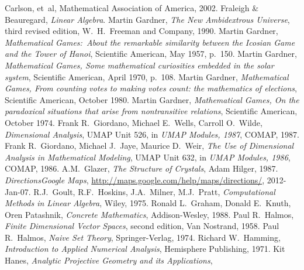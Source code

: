 \begin{thebibliography}{\makebox[2em][c]{{}\hfil{}}}
  Carlson, et~al,
  Mathematical Association of America,  
  2002.
  Fraleigh \& Beauregard,
  \emph{Linear Algebra}.
  Martin Gardner,
  \emph{The New Ambidextrous Universe},
  third revised edition,
  W.\ H.\ Freeman and Company,
  1990.
 Martin Gardner,
 \emph{Mathematical Games:~About the remarkable similarity between
   the Icosian Game and the Tower of Hanoi},
 Scientific American,
 May 1957,
 p.~150. 
  Martin Gardner,
  \emph{Mathematical Games, Some mathematical curiosities embedded in the
        solar system},
  Scientific American,
  April 1970,
  p.~108.
  Martin Gardner,
  \emph{Mathematical Games, From counting votes to making votes count:
        the mathematics of elections},
  Scientific American,
  October 1980.
  Martin Gardner,
  \emph{Mathematical Games, On the paradoxical situations that arise from
        nontransitive relations},
  Scientific American,
  October 1974.
  Frank R.~Giordano,  Michael E.~Wells, Carroll O.~Wilde,
  \emph{Dimensional Analysis}, 
  UMAP Unit 526,
  in
  \emph{UMAP Modules, 1987},
  COMAP,
  1987.
  Frank R.~Giordano,  Michael J.~Jaye, Maurice D.~Weir,
  \emph{The Use of Dimensional Analysis in Mathematical Modeling}, 
  UMAP Unit 632,
  in
  \emph{UMAP Modules, 1986},
  COMAP,
  1986.
  A.M.~Glazer,
  \emph{The Structure of Crystals},
  Adam Hilger,
  1987.
  \emph{Directions\Dash Google Maps},
  \url{http://maps.google.com/help/maps/directions/},
  2012-Jan-07.
  R.J.~Goult, R.F.~Hoskins, J.A.~Milner, M.J.~Pratt,
  \emph{Computational Methods in Linear Algebra},
  Wiley,
  1975.
 Ronald L.~Graham, Donald E.~Knuth, Oren Patashnik,
 \emph{Concrete Mathematics},
 Addison-Wesley,
 1988.
  Paul R.~Halmos,
  \emph{Finite Dimensional Vector Spaces},
  second edition,
  Van Nostrand,
  1958.
  Paul R.~Halmos,
  \emph{Naive Set Theory},
  Springer-Verlag,
  1974.
  Richard W.\ Hamming,
  \emph{Introduction to Applied Numerical Analysis},
  Hemisphere Publishing,
  1971.
  Kit Hanes,
  \emph{Analytic Projective Geometry and its Applications},

\end{thebibliography}
